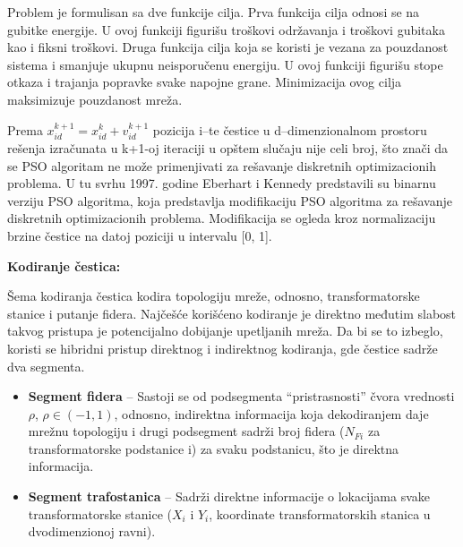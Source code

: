 \documentclass[a4paper]{article}
\begin{document}
\vspace{5mm} 

Problem je formulisan sa dve funkcije cilja. Prva funkcija cilja odnosi se na gubitke energije. U ovoj funkciji figurišu troškovi održavanja i troškovi gubitaka kao i fiksni troškovi. Druga funkcija cilja koja se koristi je vezana za pouzdanost sistema i smanjuje ukupnu neisporučenu energiju. U ovoj funkciji figurišu stope otkaza i trajanja popravke svake napojne grane. Minimizacija ovog cilja maksimizuje pouzdanost mreža.

\vspace{5mm} 

Prema \(x_{i d}^{k+1} = x_{i d}^{k} + v_{i d}^{k+1}  \) pozicija i–te čestice u d–dimenzionalnom prostoru rešenja izračunata u k+1-oj iteraciji u opštem slučaju nije celi broj, što znači da se PSO algoritam ne može primenjivati za rešavanje diskretnih optimizacionih problema. U tu svrhu 1997. godine Eberhart i Kennedy predstavili su binarnu verziju PSO algoritma, koja predstavlja modifikaciju PSO algoritma za rešavanje diskretnih optimizacionih problema. Modifikacija se ogleda kroz normalizaciju brzine čestice na datoj poziciji u intervalu [0, 1].

\vspace{5mm} 

\begin{flushleft}
\textbf{Kodiranje čestica:} 
\end{flushleft}

Šema kodiranja čestica kodira topologiju mreže, odnosno, transformatorske stanice i putanje fidera. Najčešće korišćeno kodiranje je direktno međutim slabost takvog pristupa je potencijalno dobijanje upetljanih mreža. Da bi se to izbeglo, koristi se hibridni pristup direktnog i indirektnog kodiranja, gde čestice sadrže dva segmenta.

\vspace{5mm} 

\begin{itemize}
\item \textbf{Segment fidera} – Sastoji se od podsegmenta “pristrasnosti” čvora vrednosti $\rho$,  $\rho \in (-1,1)$, odnosno, indirektna informacija koja dekodiranjem daje mrežnu topologiju i drugi podsegment sadrži broj fidera (\(N_{Fi}\) za transformatorske podstanice i) za svaku podstanicu, što je direktna informacija.

\item \textbf{Segment trafostanica} – Sadrži direktne informacije o lokacijama svake transformatorske stanice  (\(X_{i}\) i \(Y_{i}\), koordinate transformatorskih stanica u dvodimenzionoj ravni).
\end{itemize}
\end{document}
